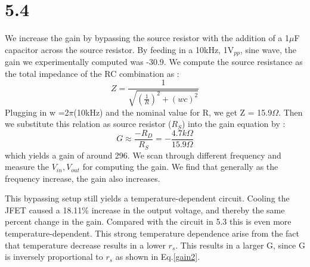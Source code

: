 \documentclass[authoryear, 12pt,5p, times]{elsarticle}
\begin{document}
\section*{5.4}
\par We increase the gain by bypassing the source resistor with the addition of a 1$\mu$F capacitor across the source resistor.  By feeding in a 10kHz, 1V$_{pp}$, sine wave, the gain we experimentally computed was -30.9. We compute the source resistance as the total impedance of the RC combination as : 
\begin{equation}
Z = \frac{1}{\sqrt{(\frac{1}{R})^2+(wc)^2}}
\end{equation} Plugging in w =2$\pi$(10kHz) and the nominal value for R, we get Z = 15.9$\Omega$. Then we substitute this relation as source resistor ($R_S$) into the gain equation by :
\begin{equation}
G\approx \frac{-R_D}{R_S}=-\frac{4.7k\Omega}{15.9\Omega}
\label{gain2}
\end{equation}
which yields a gain of around 296. We scan through different frequency and measure the $V_{in}, V_{out} $ for computing the gain. We find that generally as the frequency increase, the gain also increases.
\par This bypassing setup still yields a temperature-dependent circuit. Cooling the JFET caused a 18.11\% increase in the output voltage, and thereby the same percent change in the gain. Compared with the circuit in 5.3 this is even more temperature-dependent. This strong temperature dependence arise from the fact that temperature decrease results in a lower $r_s$. This results in a larger G, since G is inversely proportional to $r_s$ as shown in Eq.\ref{gain2}. %
\end{document}
